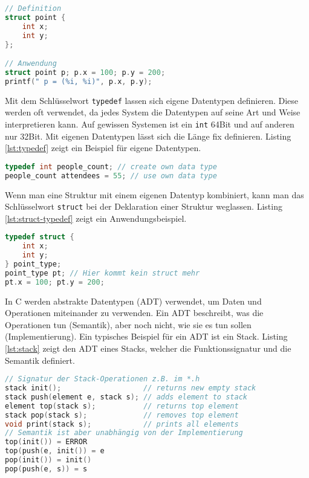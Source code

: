 \newpage

\begin{lstlisting}[language=C, caption=Strukturen, label=lst:struct]
// Definition
struct point {
	int x;
	int y;
};

// Anwendung
struct point p; p.x = 100; p.y = 200;
printf(" p = (%i, %i)", p.x, p.y);
\end{lstlisting}

Mit dem Schlüsselwort \verb|typedef| lassen sich eigene Datentypen definieren. Diese werden oft verwendet, da jedes System die Datentypen auf seine Art und Weise interpretieren kann. Auf gewissen Systemen ist ein \verb|int| 64Bit und auf anderen nur 32Bit. Mit eigenen Datentypen lässt sich die Länge fix definieren. Listing \ref{lst:typedef} zeigt ein Beispiel für eigene Datentypen.

\begin{lstlisting}[language=C, caption=Eigene Typen, label=lst:typedef]
typedef int people_count; // create own data type
people_count attendees = 55; // use own data type
\end{lstlisting}

Wenn man eine Struktur mit einem eigenen Datentyp kombiniert, kann man das Schlüsselwort \verb|struct| bei der Deklaration einer Struktur weglassen. Listing \ref{lst:struct-typedef} zeigt ein Anwendungsbeispiel.

\begin{lstlisting}[language=C, caption=Struktur als eigener Datentypen, label=lst:struct-typedef]
typedef struct {
	int x;
	int y;
} point_type;
point_type pt; // Hier kommt kein struct mehr
pt.x = 100; pt.y = 200;
\end{lstlisting}

In C werden abstrakte Datentypen (ADT) verwendet, um Daten und Operationen miteinander zu verwenden. Ein ADT beschreibt, was die Operationen tun (Semantik), aber noch nicht, wie sie es tun sollen (Implementierung). Ein typisches Beispiel für ein ADT ist ein Stack. Listing \ref{lst:stack} zeigt den ADT eines Stacks, welcher die Funktionssignatur und die Semantik definiert.

\begin{lstlisting}[language=C, caption=ADT Stack, label=lst:stack]
// Signatur der Stack-Operationen z.B. im *.h
stack init(); 					// returns new empty stack
stack push(element e, stack s); // adds element to stack
element top(stack s); 			// returns top element
stack pop(stack s); 			// removes top element
void print(stack s); 			// prints all elements
// Semantik ist aber unabhängig von der Implementierung
top(init()) = ERROR
top(push(e, init()) = e
pop(init()) = init()
pop(push(e, s)) = s
\end{lstlisting}

